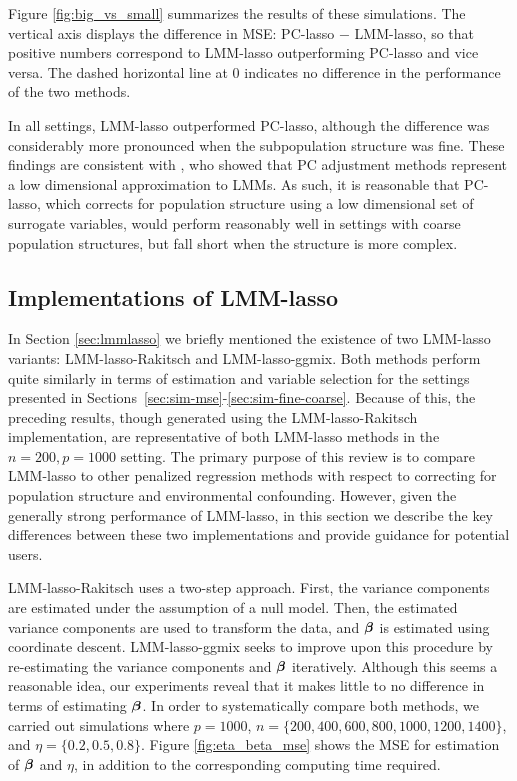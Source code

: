 Figure \ref{fig:big_vs_small} summarizes the results of these simulations. The vertical axis displays the difference in MSE: PC-lasso $-$ LMM-lasso, so that positive numbers correspond to LMM-lasso outperforming PC-lasso and vice versa. The dashed horizontal line at 0 indicates no difference in the performance of the two methods.

In all settings, LMM-lasso outperformed PC-lasso, although the difference was considerably more pronounced when the subpopulation structure was fine.  These findings are consistent with \citet{hoffman2013correcting}, who showed that PC adjustment methods represent a low dimensional approximation to LMMs. As such, it is reasonable that PC-lasso, which corrects for population structure using a low dimensional set of surrogate variables, would perform reasonably well in settings with coarse population structures, but fall short when the structure is more complex.

\subsection{Implementations of LMM-lasso}

In Section \ref{sec:lmmlasso} we briefly mentioned the existence of two LMM-lasso variants: LMM-lasso-Rakitsch and LMM-lasso-ggmix. Both methods perform quite similarly in terms of estimation and variable selection for the settings presented in Sections~\ref{sec:sim-mse}-\ref{sec:sim-fine-coarse}. Because of this, the preceding results, though generated using the LMM-lasso-Rakitsch implementation, are representative of both LMM-lasso methods in the $n = 200, p = 1000$ setting. The primary purpose of this review is to compare LMM-lasso to other penalized regression methods with respect to correcting for population structure and environmental confounding. However, given the generally strong performance of LMM-lasso, in this section we describe the key differences between these two implementations and provide guidance for potential users.

LMM-lasso-Rakitsch uses a two-step approach. First, the variance components are estimated under the assumption of a null model. Then, the estimated variance components are used to transform the data, and $\boldsymbol{\beta}{}$ is estimated using coordinate descent. LMM-lasso-ggmix seeks to improve upon this procedure by re-estimating the variance components and $\boldsymbol{\beta}{}$ iteratively. Although this seems a reasonable idea, our experiments reveal that it makes little to no difference in terms of estimating $\boldsymbol{\beta}{}$. In order to systematically compare both methods, we carried out simulations where $p = 1000$, $n = \{200, 400, 600, 800, 1000, 1200, 1400\}$, and $\eta = \{0.2, 0.5, 0.8\}$. Figure \ref{fig:eta_beta_mse} shows the MSE for estimation of $\boldsymbol{\beta}{}$ and $\eta$, in addition to the corresponding computing time required. 

